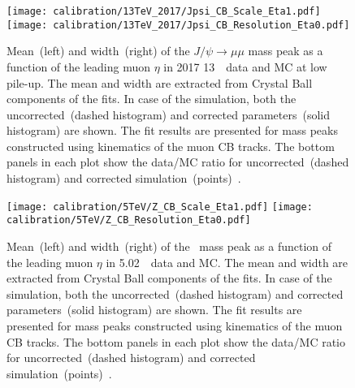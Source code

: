 	\begin{figure}[htb!]
		\begin{center}
			\texttt{[image: calibration/13TeV\_2017/Jpsi\_CB\_Scale\_Eta1.pdf]}
			\texttt{[image: calibration/13TeV\_2017/Jpsi\_CB\_Resolution\_Eta0.pdf]}
			\caption{Mean~(left) and width~(right) of the $J/\psi \to \mu\mu$ mass peak as a function of the leading muon $\eta$ in 2017 13~\TeV\ data and MC at low pile-up. The mean and width are extracted from Crystal Ball components of the fits. In case of the simulation, both the uncorrected~(dashed histogram) and corrected parameters~(solid histogram) are shown. The fit results are presented for mass peaks constructed using kinematics of the muon CB tracks. The bottom panels in each plot show the data/MC ratio for uncorrected~(dashed histogram) and corrected simulation~(points)~\cite{int_note_muons}.}
			\label{fig:calib-Jpsi-13TeV}
		\end{center}
	\end{figure}

	\begin{figure}[htb!]
		\begin{center}
			\texttt{[image: calibration/5TeV/Z\_CB\_Scale\_Eta1.pdf]}
			\texttt{[image: calibration/5TeV/Z\_CB\_Resolution\_Eta0.pdf]}
			\caption{Mean~(left) and width~(right) of the \Zmm\ mass peak as a function of the leading muon $\eta$ in 5.02~\TeV\ data and MC. The mean and width are extracted from Crystal Ball components of the fits. In case of the simulation, both the uncorrected~(dashed histogram) and corrected parameters~(solid histogram) are shown. The fit results are presented for mass peaks constructed using kinematics of the muon CB tracks. The bottom panels in each plot show the data/MC ratio for uncorrected~(dashed histogram) and corrected simulation~(points)~\cite{int_note_muons}.}
			\label{fig:calib-Z-5TeV}
		\end{center}
	\end{figure}
	
